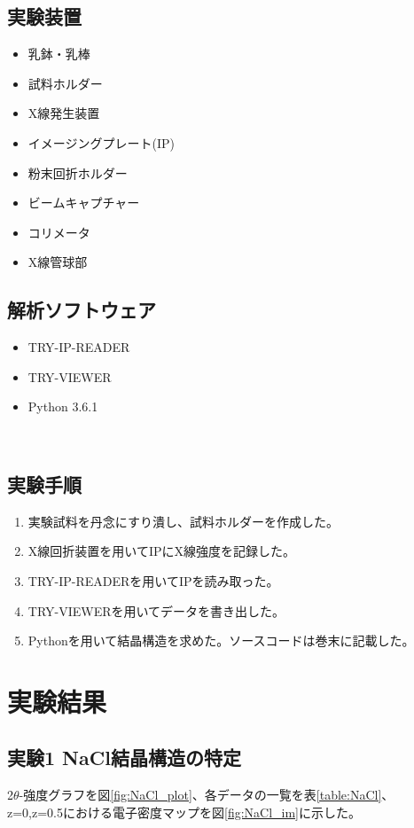 \documentclass[a4paper,12pt]{jarticle}
\begin{document}
  \subsection{実験装置}
   \begin{itemize}
    \item 乳鉢・乳棒
    \item 試料ホルダー
    \item X線発生装置
    \item イメージングプレート(IP)
    \item 粉末回折ホルダー
    \item ビームキャプチャー
    \item コリメータ
    \item X線管球部
   \end{itemize}

   \subsection{解析ソフトウェア}
    \begin{itemize}
     \item TRY-IP-READER
     \item TRY-VIEWER
     \item Python 3.6.1
    \end{itemize}

 　\subsection{実験手順}

  \renewcommand{\labelenumi}
   {(\arabic{enumi})}

  \begin{enumerate}
   \item 実験試料を丹念にすり潰し、試料ホルダーを作成した。
   \item X線回折装置を用いてIPにX線強度を記録した。
   \item TRY-IP-READERを用いてIPを読み取った。
   \item TRY-VIEWERを用いてデータを書き出した。
   \item Pythonを用いて結晶構造を求めた。ソースコードは巻末に記載した。
  \end{enumerate}


\section{実験結果}
  \subsection{実験1 NaCl結晶構造の特定}
   2$\theta$-強度グラフを図\ref{fig:NaCl_plot}、各データの一覧を表\ref{table:NaCl}、
   z=0,z=0.5における電子密度マップを図\ref{fig:NaCl_im}に示した。
\end{document}
